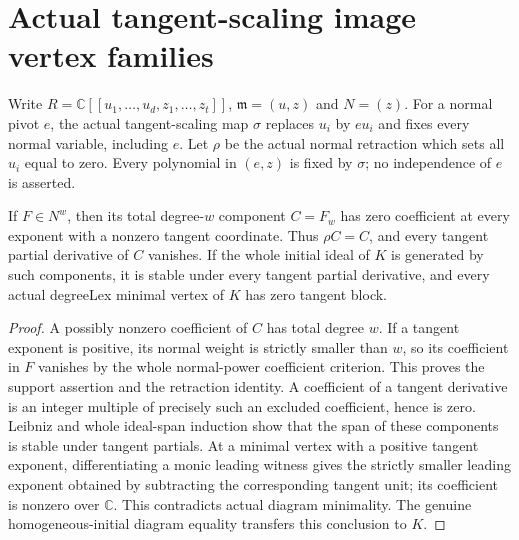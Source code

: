 \section{Actual tangent-scaling image vertex families}

Write $R=\mathbb C[[u_1,\ldots,u_d,z_1,\ldots,z_t]]$,
$\mathfrak m=(u,z)$ and $N=(z)$. For a normal pivot $e$, the actual
tangent-scaling map $\sigma$ replaces $u_i$ by $eu_i$ and fixes every
normal variable, including $e$. Let $\rho$ be the actual normal retraction
which sets all $u_i$ equal to zero. Every polynomial in $(e,z)$ is fixed by
$\sigma$; no independence of $e$ is asserted.

\begin{lemma}
\label{hir:actual-normal-order-total-component-tangent-free}
\leanok
If $F\in N^w$, then its total degree-$w$ component $C=F_w$ has zero
coefficient at every exponent with a nonzero tangent coordinate. Thus
$\rho C=C$, and every tangent partial derivative of $C$ vanishes. If the
whole initial ideal of $K$ is generated by such components, it is stable
under every tangent partial derivative, and every actual degreeLex minimal
vertex of $K$ has zero tangent block.
\end{lemma}
\begin{proof}
A possibly nonzero coefficient of $C$ has total degree $w$. If a tangent
exponent is positive, its normal weight is strictly smaller than $w$, so
its coefficient in $F$ vanishes by the whole normal-power coefficient
criterion. This proves the support assertion and the retraction identity.
A coefficient of a tangent derivative is an integer multiple of precisely
such an excluded coefficient, hence is zero. Leibniz and whole ideal-span
induction show that the span of these components is stable under tangent
partials. At a minimal vertex with a positive tangent exponent, differentiating
a monic leading witness gives the strictly smaller leading exponent obtained
by subtracting the corresponding tangent unit; its coefficient is nonzero
over $\mathbb C$. This contradicts actual diagram minimality. The genuine
homogeneous-initial diagram equality transfers this conclusion to $K$.
\end{proof}

